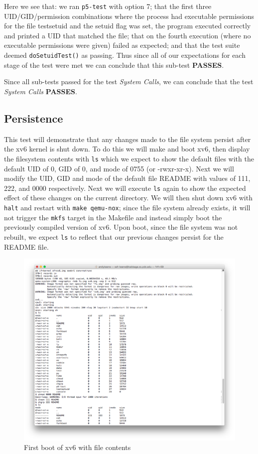 \documentclass[11pt,letterpaper]{report}
\begin{document}
\pagebreak

Here we see that: we ran {\tt p5-test} with option 7;  that the first three UID/GID/permission combinations where the process had executable permissions for the file testsetuid and the setuid flag was set, the program executed correctly 
and printed a UID that matched the file; 
that on the fourth execution (where no executable permissions were given) failed as expected; and that the test suite deemed {\tt doSetuidTest()} as passing. 
Thus since all of our expectations for each stage of the test were met we can conclude that this sub-test \textbf{PASSES}.

Since all sub-tests passed for the test \emph{System Calls}, we can conclude that the test \emph{System Calls} \textbf{PASSES}.

		\subsection*{Persistence}
		This test will demonstrate that any changes made to the file system persist after the xv6 kernel is shut down. To do this we will make and boot xv6, then display the filesystem contents
		with {\tt ls} which we expect to show the default files with the default UID of 0, GID of 0, and mode of 0755 (or -rwxr-xr-x). Next we will modify the UID, GID and mode of the default file
		README with values of 111, 222, and 0000 respectively. Next we will execute {\tt ls} again to show the expected effect of these changes on the current directory. We will then shut down
		xv6 with {\tt halt} and restart with {\tt make qemu-nox}; since the file system already exists, it will not trigger the {\tt mkfs} target in the Makefile and instead simply boot the previously
		 compiled version of xv6. Upon boot, since the file system was not rebuilt, we expect {\tt ls} to reflect that our previous changes persist for the README file.

\begin{figure}[h!]
\centering
\includegraphics[width=0.8\linewidth]{persistence1.png}
\caption{First boot of xv6 with file contents}
\label{fig:datetest}
\end{figure}	
\end{document}
